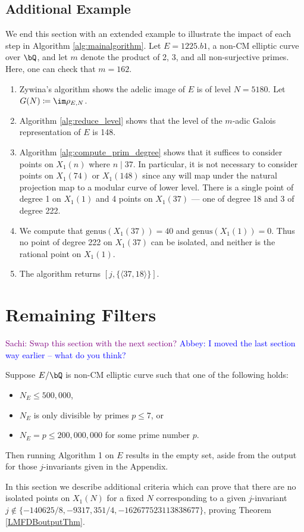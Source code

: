 \documentclass[11pt,reqno]{amsart}
\theoremstyle{plain}
\theoremstyle{definition}
\newcommand{\Q}{\bQ}
\newcommand{\abbey}[1]{\textcolor{blue}{Abbey: #1}}
\newcommand{\sachi}[1]{\textcolor{purple}{Sachi: #1}}
\newcommand{\abedit}[1]{{\color{blue} #1}}
\begin{document}
\subsection{Additional Example}

We end this section with an extended example to illustrate the impact of each step in Algorithm \ref{alg:mainalgorithm}. Let $E=1225.b1$, a non-CM elliptic curve over $\Q$, and let $m$ denote the product of 2, 3, and all non-surjective primes. Here, one can check that $m=162$.
\begin{enumerate}
\item Zywina's algorithm shows the adelic image of $E$ is of level $N=5180$. Let $G(N) \coloneqq \im \rho_{E,N}$.
\item Algorithm \ref{alg:reduce_level} shows that the level of the $m$-adic Galois representation of $E$ is 148.
\item Algorithm \ref{alg:compute_prim_degree} shows that it suffices to consider points on $X_1(n)$ where $n \mid 37$. In particular, it is not necessary to consider points on $X_1(74)$ or $X_1(148)$ since any will map under the natural projection map to a modular curve of lower level. There is a single point of degree 1 on $X_1(1)$ and 4 points on $X_1(37)$ --- one of degree 18 and 3 of degree 222.
\item We compute that $\text{genus}(X_1(37))=40$ and  $\text{genus}(X_1(1))=0$. Thus no point of degree 222 on $X_1(37)$ can be isolated, and neither is the rational point on $X_1(1)$.
\item The algorithm returns $[j, \{\langle 37, 18 \rangle\}]$.
\end{enumerate}



\section{Remaining Filters}
\label{sec:remainingfilters}

\sachi{Swap this section with the next section?} \abbey{I moved the last section way earlier -- what do you think?}

\abedit{Suppose $E/\Q$ is non-CM elliptic curve such that one of the following holds:
\begin{itemize}
    \item$N_E \leq 500{,}000$,
    \item $N_E$ is only divisible by primes $p \leq 7$, or
    \item $N_E=p \leq 200{,}000{,}000$ for some prime number $p$.
\end{itemize} Then running Algorithm 1 on $E$ results in the empty set, aside from the output for those $j$-invariants given in the Appendix.}
In this section we describe additional criteria which can prove that there are no isolated points on $X_1(N)$ for a fixed $N$ corresponding to a given $j$-invariant \abedit{$j \notin \{-140625/8,-9317,351/4, -162677523113838677\}$, proving Theorem \ref{LMFDBoutputThm}}. 
\end{document}

